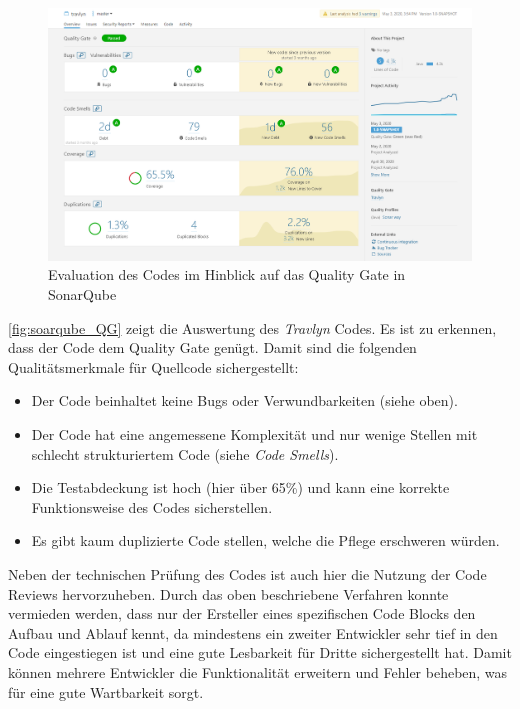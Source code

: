 	\begin{figure}[ht!]
		\centering
		\includegraphics[width=1\textwidth]{images/sonar_passed_QG.png}
		\caption{Evaluation des Codes im Hinblick auf das Quality Gate in SonarQube}
		\label{fig:soarqube_QG}
	\end{figure}

	\autoref{fig:soarqube_QG} zeigt die Auswertung des \textit{Travlyn} Codes. Es ist zu erkennen, dass der Code dem Quality Gate genügt. Damit sind die folgenden Qualitätsmerkmale für Quellcode sichergestellt:
	
	\begin{itemize}
		\item Der Code beinhaltet keine Bugs oder Verwundbarkeiten (siehe oben).
		\item Der Code hat eine angemessene Komplexität und nur wenige Stellen mit schlecht strukturiertem Code (siehe \textit{Code Smells}).
		\item Die Testabdeckung ist hoch (hier über 65\%) und kann eine korrekte Funktionsweise des Codes sicherstellen.
		\item Es gibt kaum duplizierte Code stellen, welche die Pflege erschweren würden. 
	\end{itemize} 
	
	\newpage
	
	Neben der technischen Prüfung des Codes ist auch hier die Nutzung der Code Reviews hervorzuheben. Durch das oben beschriebene Verfahren konnte vermieden werden, dass nur der Ersteller eines spezifischen Code Blocks den Aufbau und Ablauf kennt, da mindestens ein zweiter Entwickler sehr tief in den Code eingestiegen ist und eine gute Lesbarkeit für Dritte sichergestellt hat. Damit können mehrere Entwickler die Funktionalität erweitern und Fehler beheben, was für eine gute Wartbarkeit sorgt.
	
